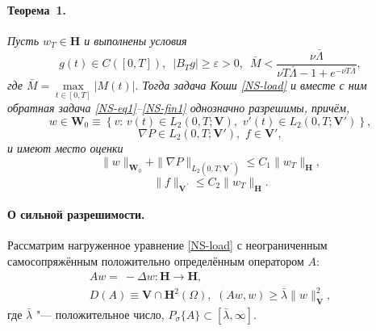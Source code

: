 \paragraph{Теорема~1.} {\it
Пусть $w_T\in\mathbf{H}$ и выполнены условия
\begin{equation}\label{NS-cond2}
g(t)\in C([0,T]),\,\,\, \left|B_Tg\right|\geq\varepsilon>0,\,\,\, \bar{M}<\frac{\nu \bar{\Lambda}}{\nu T\bar{\Lambda}-1+e^{-\nu T\bar{\Lambda}}},
\end{equation}
где $\bar{M}=\max\limits_{t\in[0,T]}|M(t)|.$
Тогда задача Коши \eqref{NS-load} и вместе с ним обратная задача \eqref{NS-eq1}--\eqref{NS-fin1} однозначно разрешимы, причём,
$$
w\in \mathbf{W}_0\equiv \left\{v:\, v(t)\in L_2(0,T;\mathbf{V}),\,\, v'(t)\in L_2(0,T;\mathbf{V}')\right\},
$$
$$
\nabla P\in L_2(0,T; \mathbf{V}'),\,\, f\in \mathbf{V}',
$$
и имеют место оценки
\begin{equation} \label{NS-est1}
\|w\|_{\mathbf{W}_0}+\|\nabla P\|_{L_2(0,T; \mathbf{V}^{\,'})}\leq C_1\|w_T\|_{\mathbf{H}},
\end{equation}
\begin{equation} \label{NS-est2}
\|f\|_{\mathbf{V}^{\,'}}\leq C_2\|w_T\|_{\mathbf{H}}.
\end{equation}
}

\paragraph{О сильной разрешимости.}
Рассматрим нагруженное уравнение \eqref{NS-load} с неограниченным самосопряжённым положительно определённым оператором $A$:
\begin{multline} \label{NS-opA2}
Aw=\ - \Delta w: \mathbf{H}\to\mathbf{H},
\\
D(A)\equiv \mathbf{V}\cap \mathbf{H}^2(\Omega),\,\, (Aw,w)\geq\bar{\lambda}\|w\|_{\mathbf{V}}^2,
\end{multline}
где $\bar{\lambda}$ "--- положительное число, $P_\sigma\{A\}\subset[\bar{\lambda},\infty].$

